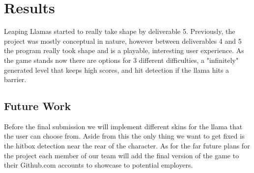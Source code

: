 \documentclass[10pt,conference,onecolumn,compsoc]{IEEEtran}
\begin{document}
\section{Results}
Leaping Llamas started to really take shape by deliverable 5. Previously, the project was mostly conceptual in nature, however between deliverables 4 and 5 the program really took shape and is a playable, interesting user experience. As the game stands now there are options for 3 different difficulties, a "infinitely" generated level that keeps high scores, and hit detection if the llama hits a barrier.

\subsection{Future Work}
Before the final submission we will implement different skins for the llama that the user can choose from. Aside from this the only thing we want to get fixed is the hitbox detection near the rear of the character. As for the far future plans for the project each member of our team will add the final version of the game to their Github.com accounts to showcase to potential employers.
\end{document}
